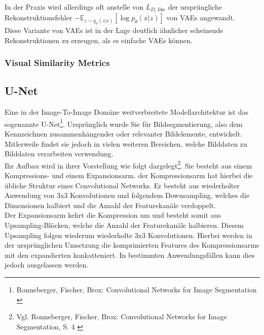 In der Praxis wird allerdings oft anstelle von $L_{D_l\text{ like}}$ der ursprüngliche Rekonstruktionsfehler $- \mathbb E_{z \sim q_{\phi}(z|x)}
    \left [
        \log p_\theta(x|z)
    \right ]$ von VAEs angewandt. \\
Diese Variante von VAEs ist in der Lage deutlich ähnlicher scheinende Rekonstruktionen zu erzeugen, als es einfache VAEs können.


\subsubsection{Visual Similarity Metrics}




\subsection{U-Net}
\label{subsec:Unet}

Eine in der Image-To-Image Domäne weitverbreitete Modellarchitektur ist das  sogenannte U-Net\footnote{
    Ronneberger, Fischer, Brox: Convolutional Networks for Image Segmentation
    \cite{ronneberger2015unetconvolutionalnetworksbiomedical}
}. Ursprünglich wurde Sie für Bildsegmentierung, also dem Kennzeichnen zusammenhängender oder relevanter Bildelemente, entwickelt. Mitlerweile findet sie jedoch in vielen weiteren Bereichen, welche Bilddaten zu Bilddaten verarbeiten verwendung. \\
Ihr Aufbau wird in ihrer Vorstellung wie folgt dargelegt\footnote{
    Vgl. Ronneberger, Fischer, Brox: Convolutional Networks for Image Segmentation, S. 4
    \cite{ronneberger2015unetconvolutionalnetworksbiomedical}
}. Sie besteht aus einem Kompressions- und einem Expansionsarm. der Kompressionsarm hat hierbei die übliche Struktur eines Convolutional Networks. Er besteht aus wiederholter Anwendung von 3x3 Konvolutionen und folgendem Downsampling, welches die Dimensionen halbiert und die Anzahl der Featurekanäle verdoppelt. \\
Der Expansionsarm kehrt die Kompression um und besteht somit aus Upsampling-Blöcken, welche die Anzahl der Featurekanäle halbieren. Diesem Upsampling folgen wiederum wiederholte 3x3 Konvolutionen. Hierbei werden in der ursprünglichen Umsetzung die komprimierten Features des Kompressionsarms mit den expandierten konkatteniert. In bestimmten Anwendungsfällen kann dies jedoch ausgelassen werden. 





